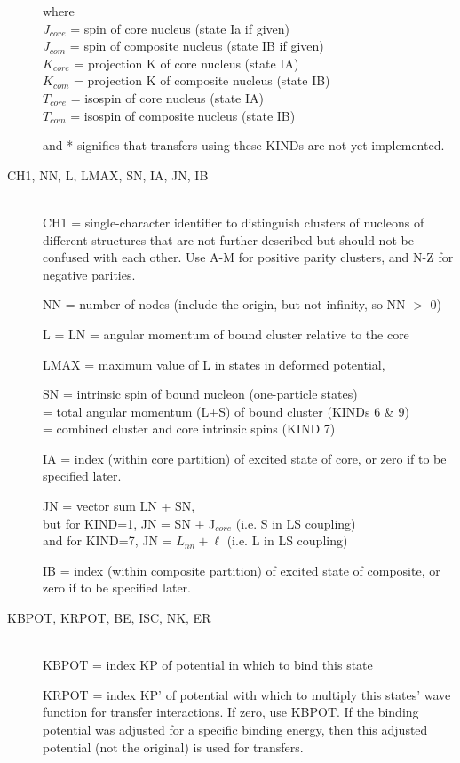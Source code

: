 \documentclass[11pt]{article}
\begin{document}
\begin{description}
where
\\  $J_{core}$ = spin of core nucleus (state Ia if given)
\\  $J_{com}$  = spin of composite nucleus (state IB if given)
\\  $K_{core}$ = projection K of core nucleus (state IA)
\\  $K_{com}$  = projection K of composite nucleus (state IB)
\\  $T_{core}$ = isospin of core nucleus (state IA)
\\  $T_{com}$  = isospin of composite nucleus (state IB)


and  *  signifies that transfers using these KINDs are not yet implemented.

\item[CH1, NN, L, LMAX, SN, IA, JN, IB] ~\\
%
CH1 = single-character identifier to distinguish clusters of
nucleons of different structures that are not further described
but should not be confused with each other.
Use A-M for positive parity clusters, and N-Z for negative parities.

NN = number of nodes (include the origin, but not infinity, so NN $>$ 0)

L  = LN = angular momentum of bound cluster relative to the core

LMAX = maximum value of L in states in deformed potential,

SN
      = intrinsic spin of bound nucleon (one-particle states)
\\  = total angular momentum (L+S) of bound cluster (KINDs 6 \& 9)
\\  = combined cluster and core intrinsic spins     (KIND 7)

IA = index (within core partition) of excited state of core,
or zero if to be specified later.

 JN
     = vector sum LN + SN,
\\   but for KIND=1, JN = SN + J$_{core}$  (i.e. S in LS coupling)
\\    and for KIND=7, JN = $L_{nn} + \ell$     (i.e. L in LS coupling)


IB = index (within composite partition) of excited state of composite,
or zero if to be specified later.

\item[KBPOT, KRPOT, BE,   ISC, NK, ER] ~\\
%
KBPOT = index KP of potential in which to bind this state

KRPOT = index KP' of potential with which to multiply this states'
wave function for transfer interactions. If zero, use KBPOT.
If the binding potential was adjusted for a specific binding
energy, then this adjusted potential (not the original) is used
for transfers.


\end{description}
\end{document}
